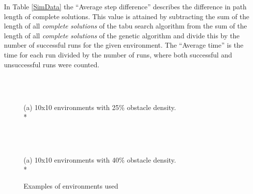 In Table \ref{SimData} the ``Average step difference'' describes the difference in path length of complete solutions. This value is attained by subtracting the sum of the length of all \emph{complete solutions} of the tabu search algorithm from the sum of the length of all \emph{complete solutions} of the genetic algorithm and divide this by the number of successful runs for the given environment. The ``Average time'' is the time for each run divided by the number of runs, where both successful and unsuccessful runs were counted.
\begin{center}
\begin{table}[t!hb]
\noindent{}
\caption{Data from simulations.}
\label{SimData}
\end{table}
\end{center}
\begin{figure}[t!hb]
\begin{center}
\begin{tabular}{| p{0.1cm} | p{0.1cm} | p{0.1cm} | p{0.1cm} | p{0.1cm} | p{0.1cm} | p{0.1cm} | p{0.1cm} | p{0.1cm} | p{0.1cm} | }
\hline
 
\hline
\end{tabular}
\hspace{0.5cm}
\begin{tabular}{| p{0.1cm} | p{0.1cm} | p{0.1cm} | p{0.1cm} | p{0.1cm} | p{0.1cm} | p{0.1cm} | p{0.1cm} | p{0.1cm} | p{0.1cm} | }
\hline
 
\hline
\end{tabular}
\vspace{0.1cm}\\(a) 10x10 environments with 25\% obstacle density.\\*
\end{center}
\vspace{0.05cm}
\begin{center}
\begin{tabular}{| p{0.1cm} | p{0.1cm} | p{0.1cm} | p{0.1cm} | p{0.1cm} | p{0.1cm} | p{0.1cm} | p{0.1cm} | p{0.1cm} | p{0.1cm} | }
\hline
 
\hline
\end{tabular}
\hspace{0.5cm}
\begin{tabular}{| p{0.1cm} | p{0.1cm} | p{0.1cm} | p{0.1cm} | p{0.1cm} | p{0.1cm} | p{0.1cm} | p{0.1cm} | p{0.1cm} | p{0.1cm} | }
\hline
 
\hline
\end{tabular}
\vspace{0.1cm}\\(a) 10x10 environments with 40\% obstacle density.\\*
\caption{Examples of environments used}
\end{center}
\label{Envs}
\end{figure}
